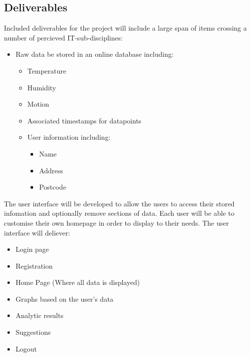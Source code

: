 \documentclass{article}
\begin{document}
        \subsection{Deliverables}
            Included deliverables for the project will include a large span of items crossing a number
            of percieved IT-sub-disciplines:
            \begin{itemize}
                \item Raw data be stored in an online database including:
                \begin{itemize}
                    \item Temperature
                    \item Humidity
                    \item Motion
                    \item Associated timestamps for datapoints
                    \item User information including:
                    \begin{itemize}
                        \item Name
                        \item Address
                        \item Postcode
                    \end{itemize}
                \end{itemize}
            \end{itemize}

            The user interface will be developed to allow the users to access their stored
            infomation and optionally remove sections of data. Each user will be able to customise 
            their own homepage in order to display to their needs. The user interface will deliever:
            \begin{itemize}
                \item Login page
                \item Registration
                \item Home Page (Where all data is displayed)
                \item Graphs based on the user's data
                \item Analytic results
                \item Suggestions
                \item Logout
            \end{itemize}
            \newpage
\end{document}
